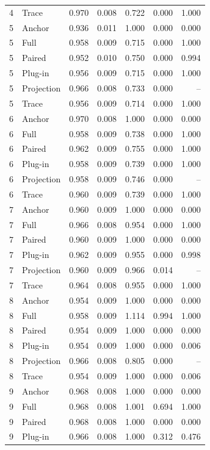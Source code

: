 \begin{longtable}{rlrrrrr}
4 & Trace & 0.970 & 0.008 & 0.722 & 0.000 & 1.000\\
5 & Anchor & 0.936 & 0.011 & 1.000 & 0.000 & 0.000\\
5 & Full & 0.958 & 0.009 & 0.715 & 0.000 & 1.000\\
5 & Paired & 0.952 & 0.010 & 0.750 & 0.000 & 0.994\\
5 & Plug-in & 0.956 & 0.009 & 0.715 & 0.000 & 1.000\\
5 & Projection & 0.966 & 0.008 & 0.733 & 0.000 & --\\
5 & Trace & 0.956 & 0.009 & 0.714 & 0.000 & 1.000\\
6 & Anchor & 0.970 & 0.008 & 1.000 & 0.000 & 0.000\\
6 & Full & 0.958 & 0.009 & 0.738 & 0.000 & 1.000\\
6 & Paired & 0.962 & 0.009 & 0.755 & 0.000 & 1.000\\
6 & Plug-in & 0.958 & 0.009 & 0.739 & 0.000 & 1.000\\
6 & Projection & 0.958 & 0.009 & 0.746 & 0.000 & --\\
6 & Trace & 0.960 & 0.009 & 0.739 & 0.000 & 1.000\\
7 & Anchor & 0.960 & 0.009 & 1.000 & 0.000 & 0.000\\
7 & Full & 0.966 & 0.008 & 0.954 & 0.000 & 1.000\\
7 & Paired & 0.960 & 0.009 & 1.000 & 0.000 & 0.000\\
7 & Plug-in & 0.962 & 0.009 & 0.955 & 0.000 & 0.998\\
7 & Projection & 0.960 & 0.009 & 0.966 & 0.014 & --\\
7 & Trace & 0.964 & 0.008 & 0.955 & 0.000 & 1.000\\
8 & Anchor & 0.954 & 0.009 & 1.000 & 0.000 & 0.000\\
8 & Full & 0.958 & 0.009 & 1.114 & 0.994 & 1.000\\
8 & Paired & 0.954 & 0.009 & 1.000 & 0.000 & 0.000\\
8 & Plug-in & 0.954 & 0.009 & 1.000 & 0.000 & 0.006\\
8 & Projection & 0.966 & 0.008 & 0.805 & 0.000 & --\\
8 & Trace & 0.954 & 0.009 & 1.000 & 0.000 & 0.006\\
9 & Anchor & 0.968 & 0.008 & 1.000 & 0.000 & 0.000\\
9 & Full & 0.968 & 0.008 & 1.001 & 0.694 & 1.000\\
9 & Paired & 0.968 & 0.008 & 1.000 & 0.000 & 0.000\\
9 & Plug-in & 0.966 & 0.008 & 1.000 & 0.312 & 0.476\\

\end{longtable}
